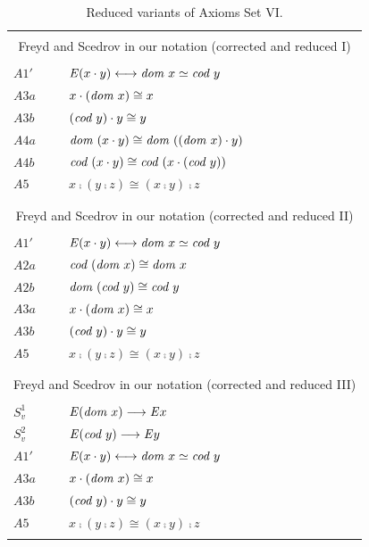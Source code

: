 \begin{table} \centering \normalsize
\begin{tabular}{ll}
\\
\hline
\\
\multicolumn{2}{c}{Freyd and Scedrov in our notation (corrected and
  reduced I)} \\
\\
  $A1'$  & $\mathit{E} (x \cdot y) \longleftrightarrow \textit{dom \/} x \simeq\textit{cod \/} y$ \\
  $A3a$  & $x \cdot (\textit{dom \/} x) \cong x$ \\ 
  $A3b$ & $(\textit{cod \/} y) \cdot y \cong y$ \\
  $A4a$ & $\textit{dom \/}(x \cdot y) \cong \textit{dom \/}((\textit{dom \/} x) \cdot y)$ \\ 
  $A4b$ & $\textit{cod \/}(x \cdot y) \cong \textit{cod \/}(x \cdot (\textit{cod \/} y))$ \\ 
  $A5$   & $x \comp (y \comp z) \cong  (x \comp y) \comp z$   \\
\\
\hline
\\
\multicolumn{2}{c}{Freyd and Scedrov in our notation (corrected and
  reduced II)} \\
\\
  $A1'$  & $\mathit{E} (x \cdot y) \longleftrightarrow \textit{dom \/} x \simeq\textit{cod \/} y$ \\
  $A2a$ & $\textit{cod \/}(\textit{dom \/} x) \cong \textit{dom \/} x$ \\  
  $A2b$ & $\textit{dom \/}(\textit{cod \/} y) \cong \textit{cod \/} y$ \\  
  $A3a$  & $x \cdot (\textit{dom \/} x) \cong x$ \\ 
  $A3b$ & $(\textit{cod \/} y) \cdot y \cong y$ \\
  $A5$   & $x \comp (y \comp z) \cong  (x \comp y) \comp z$   \\
\\
\hline
\\
\multicolumn{2}{c}{Freyd and Scedrov in our notation (corrected and
  reduced III)} \\
\\
 $S^1_{v}$ & $\mathit{E} (\textit{dom \/} x) \longrightarrow \mathit{E} x$ \\
  $S^2_{v}$ & $\mathit{E} (\textit{cod \/} y) \longrightarrow \mathit{E} y$ \\
  $A1'$  & $\mathit{E} (x \cdot y) \longleftrightarrow \textit{dom \/} x \simeq\textit{cod \/} y$ \\
  $A3a$  & $x \cdot (\textit{dom \/} x) \cong x$ \\ 
  $A3b$ & $(\textit{cod \/} y) \cdot y \cong y$ \\
  $A5$   & $x \comp (y \comp z) \cong  (x \comp y) \comp z$   \\
\\
\hline
\end{tabular}
\caption{Reduced variants of Axioms Set VI.\label{axioms-sets-3}}
\end{table}

